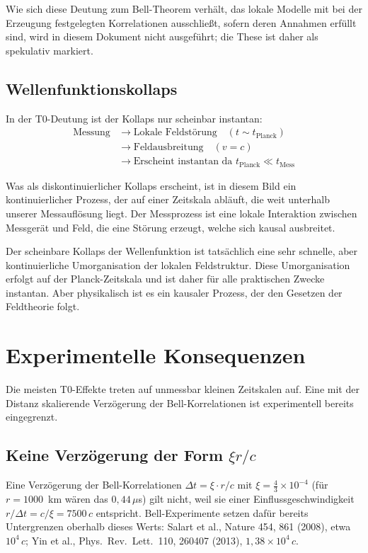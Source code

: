 	Wie sich diese Deutung zum Bell-Theorem verhält, das lokale Modelle mit bei der Erzeugung festgelegten Korrelationen ausschließt, sofern deren Annahmen erfüllt sind, wird in diesem Dokument nicht ausgeführt; die These ist daher als spekulativ markiert.
	
	\subsection{Wellenfunktionskollaps}
	
	In der T0-Deutung ist der Kollaps nur scheinbar instantan:
	\begin{align}
		\text{Messung} &\rightarrow \text{Lokale Feldstörung} \quad (t \sim t_{\text{Planck}}) \\
		&\rightarrow \text{Feldausbreitung} \quad (v = c) \\
		&\rightarrow \text{Erscheint instantan da } t_{\text{Planck}} \ll t_{\text{Mess}}
	\end{align}
	
	Was als diskontinuierlicher Kollaps erscheint, ist in diesem Bild ein kontinuierlicher Prozess, der auf einer Zeitskala abläuft, die weit unterhalb unserer Messauflösung liegt. Der Messprozess ist eine lokale Interaktion zwischen Messgerät und Feld, die eine Störung erzeugt, welche sich kausal ausbreitet.
	
	Der scheinbare Kollaps der Wellenfunktion ist tatsächlich eine sehr schnelle, aber kontinuierliche Umorganisation der lokalen Feldstruktur. Diese Umorganisation erfolgt auf der Planck-Zeitskala und ist daher für alle praktischen Zwecke instantan. Aber physikalisch ist es ein kausaler Prozess, der den Gesetzen der Feldtheorie folgt.
	
	\section{Experimentelle Konsequenzen}
	
	Die meisten T0-Effekte treten auf unmessbar kleinen Zeitskalen auf. Eine mit der Distanz skalierende Verzögerung der Bell-Korrelationen ist experimentell bereits eingegrenzt.
	
	\subsection{Keine Verzögerung der Form $\xi r/c$}
	
	Eine Verzögerung der Bell-Korrelationen $\Delta t = \xi \cdot r/c$ mit $\xi = \frac{4}{3} \times 10^{-4}$ (für $r = 1000$~km wären das $0{,}44\,\mu$s) gilt nicht, weil sie einer Einflussgeschwindigkeit $r/\Delta t = c/\xi = 7500\,c$ entspricht. Bell-Experimente setzen dafür bereits Untergrenzen oberhalb dieses Werts: Salart et al., Nature 454, 861 (2008), etwa $10^4\,c$; Yin et al., Phys.\ Rev.\ Lett.\ 110, 260407 (2013), $1{,}38\times10^4\,c$.
	
